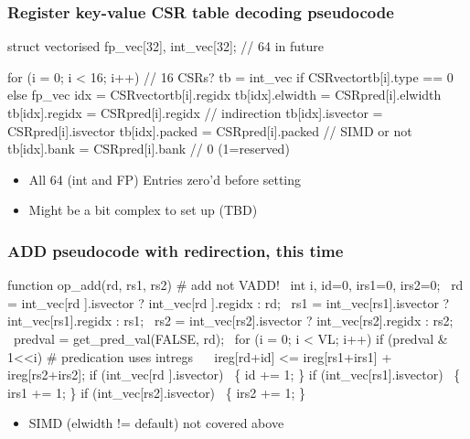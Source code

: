 \documentclass[slidestop]{beamer}
\begin{document}
\begin{frame}[fragile]
\frametitle{Register key-value CSR table decoding pseudocode}

\begin{semiverbatim}
struct vectorised fp\_vec[32], int\_vec[32]; // 64 in future

for (i = 0; i < 16; i++) // 16 CSRs?
   tb = int\_vec if CSRvectortb[i].type == 0 else fp\_vec
   idx = CSRvectortb[i].regidx
   tb[idx].elwidth  = CSRpred[i].elwidth
   tb[idx].regidx   = CSRpred[i].regidx  // indirection
   tb[idx].isvector = CSRpred[i].isvector
   tb[idx].packed   = CSRpred[i].packed  // SIMD or not
   tb[idx].bank     = CSRpred[i].bank    // 0 (1=reserved)
\end{semiverbatim}

 \begin{itemize}
   \item All 64 (int and FP) Entries zero'd before setting
   \item Might be a bit complex to set up (TBD)
  \end{itemize}

\end{frame}


\begin{frame}[fragile]
\frametitle{ADD pseudocode with redirection, this time}

\begin{semiverbatim}
function op\_add(rd, rs1, rs2) # add not VADD!
  int i, id=0, irs1=0, irs2=0;
  rd  = int\_vec[rd ].isvector ? int\_vec[rd ].regidx : rd;
  rs1 = int\_vec[rs1].isvector ? int\_vec[rs1].regidx : rs1;
  rs2 = int\_vec[rs2].isvector ? int\_vec[rs2].regidx : rs2;
  predval = get\_pred\_val(FALSE, rd);
  for (i = 0; i < VL; i++)
    if (predval \& 1<<i) # predication uses intregs
       ireg[rd+id] <= ireg[rs1+irs1] + ireg[rs2+irs2];
    if (int\_vec[rd ].isvector)  \{ id += 1; \}
    if (int\_vec[rs1].isvector)  \{ irs1 += 1; \}
    if (int\_vec[rs2].isvector)  \{ irs2 += 1; \}
\end{semiverbatim}

  \begin{itemize}
   \item SIMD (elwidth != default) not covered above
  \end{itemize}
\end{frame}
\end{document}
